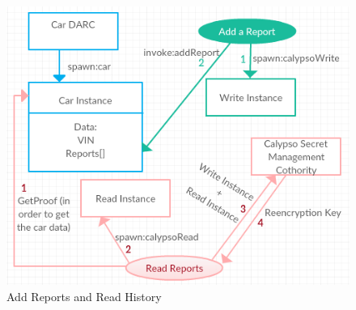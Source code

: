 \begin{figure}[H]
    \centering
    \includegraphics[width=1\textwidth]{Figures/add_read_reports.png}
    \caption{Add Reports and Read History}
    \label{Add Reports and Read History}
\end{figure}

 

